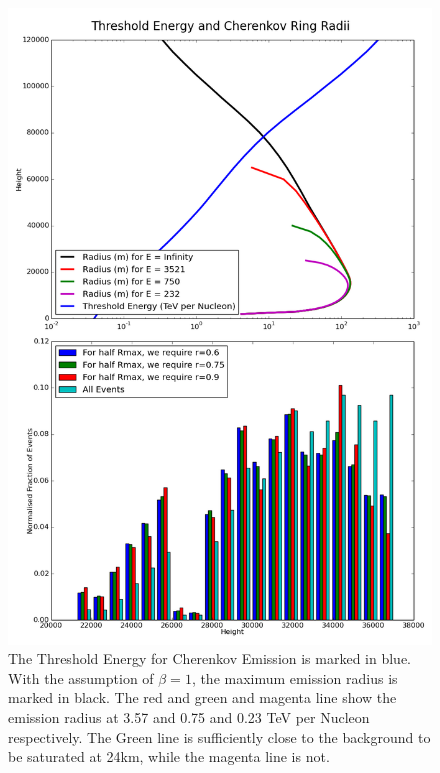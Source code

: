 \documentclass{article}
\begin{document}
\begin{figure}
\begin{center}
\includegraphics[height=0.9\textheight]{logenergyradius}
\caption{The Threshold Energy for Cherenkov Emission is marked in blue. With the assumption of $\beta=1$, the maximum emission radius is marked in black. The red and green and magenta line show the emission radius at 3.57 and 0.75 and 0.23 TeV per Nucleon respectively. The Green line is sufficiently close to the background to be saturated at 24km, while the magenta line is not.}
\label{fig:generalenergy}
\end{center}
\end{figure}
\end{document}
